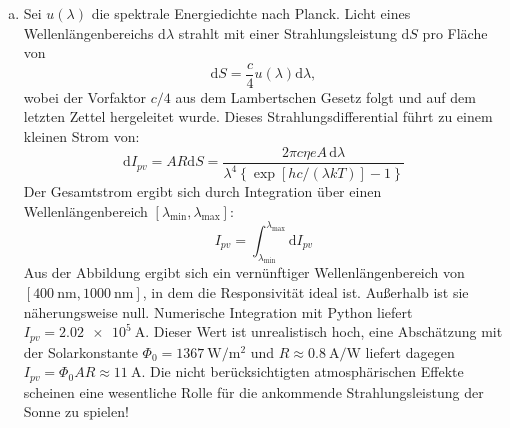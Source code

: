 \begin{enumerate}[(a)]
\item Sei $u(\lambda)$ die spektrale Energiedichte nach Planck. Licht eines Wellenlängenbereichs $\mathrm{d}\lambda$ strahlt mit einer Strahlungsleistung $\mathrm{d}S$ pro Fläche von
\begin{equation}
\mathrm{d}S = \frac{c}{4} u(\lambda) \mathrm{d}\lambda,
\end{equation}
wobei der Vorfaktor $c/4$ aus dem Lambertschen Gesetz folgt und auf dem letzten Zettel hergeleitet wurde. Dieses Strahlungsdifferential führt zu einem kleinen Strom von:
\begin{equation}
\mathrm{d} I_{pv} = A R \mathrm{d}S = \frac{2\pi c \eta e A \,\mathrm{d}\lambda}{\lambda^4\left\{\exp\left[hc/(\lambda k T)\right]-1 \right\}}
\end{equation}
Der Gesamtstrom ergibt sich durch Integration über einen Wellenlängenbereich $\left[\lambda_\text{min}, \lambda_\text{max} \right]$:
\begin{equation}
I_{pv} = \int_{\lambda_\text{min}}^{\lambda_\text{max}}\mathrm{d} I_{pv}
\end{equation}
Aus der Abbildung ergibt sich ein vernünftiger Wellenlängenbereich von $\left[\SI{400}{\nano\meter}, \SI{1000}{\nano\meter} \right]$, in dem die Responsivität ideal ist. Außerhalb ist sie näherungsweise null. Numerische Integration mit Python liefert $I_{pv}=\SI{2.02e5}{\ampere}$. Dieser Wert ist unrealistisch hoch, eine Abschätzung mit der Solarkonstante $\Phi_0 = \SI{1367}{\watt\per\meter\squared}$ und $R\approx\SI{0.8}{\ampere\per\watt}$ liefert dagegen $I_{pv} = \Phi_0 A R \approx \SI{11}{\ampere}$. Die nicht berücksichtigten atmosphärischen Effekte scheinen eine wesentliche Rolle für die ankommende Strahlungsleistung der Sonne zu spielen!
\end{enumerate}